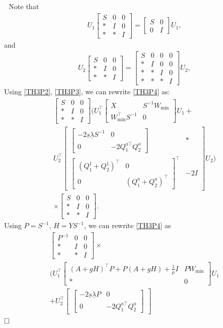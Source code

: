 \documentclass[10pt,a4paper]{amsart}
\newcommand{\bbm}[1]{\left[\begin{matrix} #1 \end{matrix}\right]}
\renewenvironment{proof}{\vspace{.1cm}\noindent{\sc Proof.}\hspace{0.10cm}\,\,}{$\hfill\Box$\vspace{.1cm}}
\begin{document}
\begin{proof}
Note that
\begin{equation}\label{TH3P2}
\begin{aligned}
&U_1\bbm{
S&0&0\\\ast&I&0\\\ast&\ast&I
}=\bbm{
S&0\\0&I
}U_1,
\end{aligned}
\end{equation}
and
\begin{equation}\label{TH3P3}
\begin{aligned}
&U_2\bbm{
S&0&0\\\ast&I&0\\\ast&\ast&I
}=\bbm{
S&0&0&0\\\ast&I&0&0\\\ast&\ast&I&0\\\ast&\ast&\ast&I
}U_2,
\end{aligned}
\end{equation}
Using \eqref{TH3P2}, \eqref{TH3P3}, we can rewrite \eqref{TH3P4} as:
\begin{equation}\label{TH3P4}
\begin{aligned}
&\bbm{
S&0&0\\\ast&I&0\\\ast&\ast&I
}\Big(U_1^\top
\bbm{
X & S^{-1}W_{\min} \\
W_{\min}^{\top}S^{-1} & 0
}
U_1 +\\
& U_2^\top
\bbm{\bbm{-2\underline{s}\underline{\lambda}S^{-1}&0\\0&-2Q^{a\top}_1 Q^a_2}
 &\ast\\
\bbm{(Q^1_1+Q^1_2)^\top&0\\0&(Q^a_1+Q^a_2)^\top}^\top  & -2I
}
U_2\Big)\\&\times\bbm{
S&0&0\\\ast&I&0\\\ast&\ast&I
}.
\end{aligned}
\end{equation}
Using $P=S^{-1}$, $H=YS^{-1}$, we can rewrite \eqref{TH3P4} as
\begin{equation}\label{TH3P5}
\begin{aligned}
&\bbm{
P^{-1}&0&0\\\ast&I&0\\\ast&\ast&I
}\times\\&\Big(U_1^\top
\bbm{
(A+gH)^\top P+P(A+gH)+\frac{1}{\mu}I & PW_{\min} \\
\ast & 0
}
U_1 \\
&+ U_2^\top
\bbm{\bbm{-2\underline{s}\underline{\lambda}P&0\\0&-2Q^{a\top}_1 Q^a_2}
}
\end{aligned}
\end{equation}
\end{proof}
\end{document}
